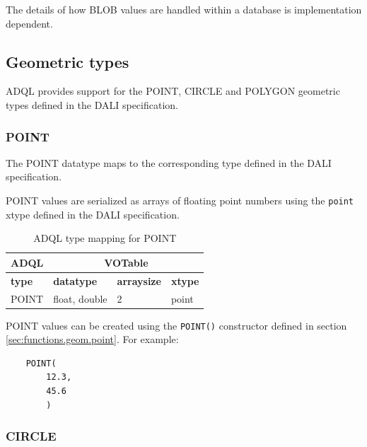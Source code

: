 \documentclass[11pt,a4paper]{ivoa}
\newcommand{\DALIspec}{DALI specification\xspace}
\begin{document}
The details of how BLOB values are handled within a
database is implementation dependent.

\subsection{Geometric types}
\label{sec:types.geom}

ADQL provides support for the POINT, CIRCLE and POLYGON geometric
types defined in the \DALIspec.

\subsubsection{POINT}
\label{sec:types.geom.point}

The POINT datatype maps to the corresponding type defined in the
\DALIspec.

POINT values are serialized as arrays of floating point numbers
using the \verb:point: xtype defined in the \DALIspec.

\begin{table}[thm]\footnotesize
    \begin{tabular}
        {|p{}|p{}|p{}|p{}|}
        \hline

        \hline
        \multicolumn{1}{|c|}{\textbf{ADQL}} &
        \multicolumn{3}{|c|}{\textbf{VOTable}}
        \tabularnewline
        
        \hline
        \textbf{type} &
        \textbf{datatype} &
        \textbf{arraysize} &
        \textbf{xtype}
        \tabularnewline

        \hline
        POINT &
        float, double &
        2 &
        point
        \tabularnewline

        \hline
    \end{tabular}
    \caption{ADQL type mapping for POINT}
    \label{table:types.geom.point}
\end{table}

POINT values can be created using the \verb:POINT():
constructor defined in section \ref{sec:functions.geom.point}.
For example:
\begin{verbatim}
    POINT(
        12.3,
        45.6
        )
\end{verbatim}


\subsubsection{CIRCLE}
\label{sec:types.geom.circle}
\end{document}
